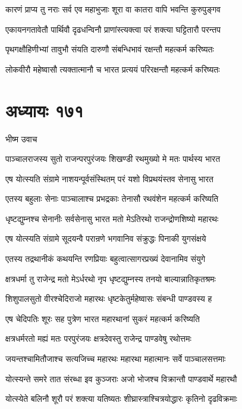 \twolineshloka
{कारणं प्राप्य तु नराः सर्व एव महाभुजाः}
{शूरा वा कातरा वापि भवन्ति कुरुपुङ्गव}


\twolineshloka
{एकायनगतावेतौ पार्थिवौ दृढधन्विनौ}
{प्राणांस्त्यक्त्वा परं शक्त्या घट्टितारौ परन्तप}


\twolineshloka
{पृथगक्षौहिणीभ्यां तावुभौ संयति दारुणौ}
{संबन्धिभावं रक्षन्तौ महत्कर्म करिष्यतः}


\twolineshloka
{लोकवीरौ महेष्वासौ त्यक्तात्मानौ च भारत}
{प्रत्ययं परिरक्षन्तौ महत्कर्म करिष्यतः}


\chapter{अध्यायः १७१}
\twolineshloka
{भीष्म उवाच}
{}


\twolineshloka
{पाञ्चालराजस्य सुतो राजन्परपुरंजयः}
{शिखण्डी रथमुख्यो मे मतः पार्थस्य भारत}


\twolineshloka
{एष योत्स्यति संग्रामे नाशयन्पूर्वसंस्थितम्}
{परं यशो विप्रथयंस्तव सेनासु भारत}


\twolineshloka
{एतस्य बहुलाः सेनाः पाञ्चालाश्च प्रभद्रकाः}
{तेनासौ रथवंशेन महत्कर्म करिष्यति}


\twolineshloka
{धृष्टद्युम्नश्च सेनानीः सर्वसेनासु भारत}
{मतो मेऽतिरथो राजन्द्रोणशिष्यो महारथः}


\twolineshloka
{एष योत्स्यति संग्रामे सूदयन्वै परान्रणे}
{भगवानिव संक्रुद्धः पिनाकी युगसंक्षये}


\twolineshloka
{एतस्य तद्रथानीकं कथयन्ति रणप्रियाः}
{बहुत्वात्सागरप्रख्यं देवानामिव संयुगे}


\twolineshloka
{क्षत्रधर्मा तु राजेन्द्र मतो मेऽर्धरथो नृप}
{धृष्टद्युम्नस्य तनयो बाल्यान्नातिकृतश्रमः}


\twolineshloka
{शिशुपालसुतो वीरश्चेदिराजो महारथः}
{धृष्टकेतुर्महेष्वासः संबन्धी पाण्डवस्य ह}


\twolineshloka
{एष चेदिपतिः शूरः सह पुत्रेण भारत}
{महारथानां सुकरं महत्कर्म करिष्यति}


\twolineshloka
{क्षत्रधर्मरतो मह्यं मतः परपुरंजयः}
{क्षत्रदेवस्तु राजेन्द्र पाण्डवेषु रथोत्तमः}


\twolineshloka
{जयन्तश्चामितौजाश्च सत्यजिच्च महारथः}
{महारथा महात्मानः सर्वे पाञ्चालसत्तमाः}


\twolineshloka
{योत्स्यन्ते समरे तात संरब्धा इव कुञ्जराः}
{अजो भोजश्च विक्रान्तौ पाण्डवार्थे महारथौ}


\twolineshloka
{योत्स्येते बलिनौ शूरौ परं शक्त्या यतिष्यतः}
{शीघ्रास्त्राश्चित्रयोद्धारः कृतिनो दृढविक्रमाः}


